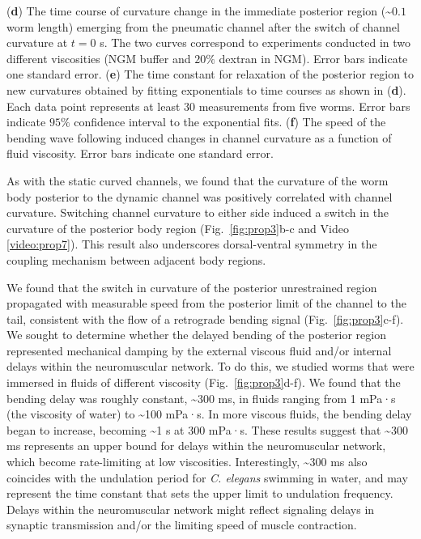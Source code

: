 \begin{FPfigure}
{(\textbf{d}) The time course of curvature change in the immediate posterior region (\textasciitilde$0.1$ worm length) 
emerging from the pneumatic channel after the switch of channel curvature at $t = 0$ s. The two 
curves correspond to experiments conducted in two different viscosities (NGM buffer and $20\%$ 
dextran in NGM). Error bars indicate one standard error.  
(\textbf{e}) The time constant for relaxation of the posterior region to new curvatures obtained by fitting 
exponentials to time courses as shown in (\textbf{d}). Each data point represents at least $30$ 
measurements from five worms. Error bars indicate $95\%$ confidence interval to the exponential 
fits.  
(\textbf{f}) The speed of the bending wave following induced changes in channel curvature as a function 
of fluid viscosity. Error bars indicate one standard error.\label{fig:prop3}}
\end{FPfigure}
\afterpage{\clearpage}


As with the static curved channels, we found that the curvature of the worm body posterior to the 
dynamic channel was positively correlated with channel curvature. Switching channel curvature 
to either side induced a switch in the curvature of the posterior body region (Fig.~\ref{fig:prop3}b-c and 
Video  \ref{video:prop7}). This result also underscores dorsal-ventral symmetry in the coupling 
mechanism between adjacent body regions. 

We found that the switch in curvature of the posterior unrestrained region propagated with 
measurable speed from the posterior limit of the channel to the tail, consistent with the flow of a 
retrograde bending signal (Fig.~\ref{fig:prop3}c-f). We sought to determine whether the delayed bending of the 
posterior region represented mechanical damping by the external viscous fluid and/or internal 
delays within the neuromuscular network. To do this, we studied worms that were immersed in 
fluids of different viscosity (Fig.~\ref{fig:prop3}d-f). We found that the bending delay was roughly constant, 
\textasciitilde300 ms, in fluids ranging from 1 mPa·s (the viscosity of water) to \textasciitilde100 mPa·s. In more viscous 
fluids, the bending delay began to increase, becoming \textasciitilde1 s at $300$ mPa·s. These results suggest 
that \textasciitilde300 ms represents an upper bound for delays within the neuromuscular network, which 
become rate-limiting at low viscosities. Interestingly, \textasciitilde300 ms also coincides with the undulation 
period for \textit{C. elegans} swimming in water, and may represent the time constant that sets the 
upper limit to undulation frequency. Delays within the neuromuscular network might reflect 
signaling delays in synaptic transmission and/or the limiting speed of muscle contraction.

